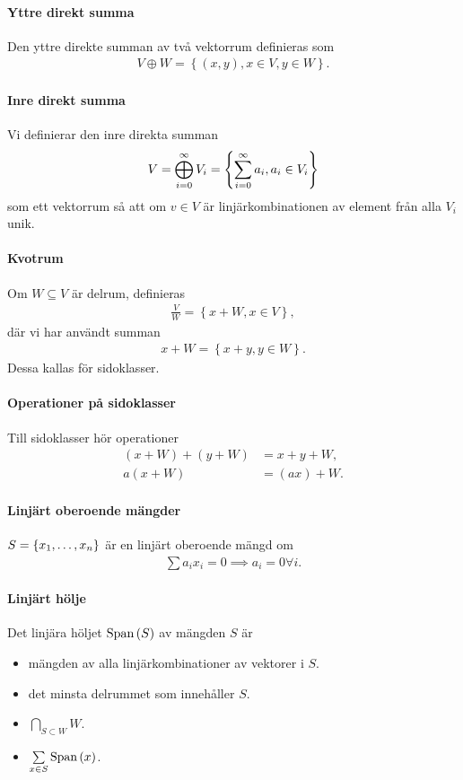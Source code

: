 \paragraph{Yttre direkt summa}
Den yttre direkte summan av två vektorrum definieras som
\begin{align*}
	V\oplus W = \left\{(x, y), x\in V, y\in W\right\}.
\end{align*}

\paragraph{Inre direkt summa}
Vi definierar den inre direkta summan
\begin{align*}
	V = \bigoplus\limits_{i = 0}^{\infty}V_{i} = \left\{\sum\limits_{i = 0}^{\infty}a_{i}, a_{i}\in V_{i}\right\}
\end{align*}
som ett vektorrum så att om $v\in V$ är linjärkombinationen av element från alla $V_{i}$ unik.

\paragraph{Kvotrum}
Om $W\subseteq V$ är delrum, definieras
\begin{align*}
	\frac{V}{W} = \left\{x + W, x\in V\right\},
\end{align*}
där vi har användt summan
\begin{align*}
	x + W = \left\{x + y, y\in W\right\}.
\end{align*}
Dessa kallas för sidoklasser.

\paragraph{Operationer på sidoklasser}
Till sidoklasser hör operationer
\begin{align*}
	(x + W) + (y + W) &= x + y + W, \\
	a(x + W)          &= (ax) + W.
\end{align*}

\paragraph{Linjärt oberoende mängder}
$S = \set{x_{1}, \dots, x_{n}}{}$ är en linjärt oberoende mängd om
\begin{align*}
	\sum a_{i}x_{i} = 0\implies a_{i} = 0 \forall i.
\end{align*}

\paragraph{Linjärt hölje}
Det linjära höljet $\text{Span}\left(S\right)$ av mängden $S$ är
\begin{itemize}
	\item mängden av alla linjärkombinationer av vektorer i $S$.
	\item det minsta delrummet som innehåller $S$.
	\item $\bigcap\limits_{S\subset W}W$.
	\item $\sum\limits_{x\in S} \text{Span}\left(x\right)$.
\end{itemize}

